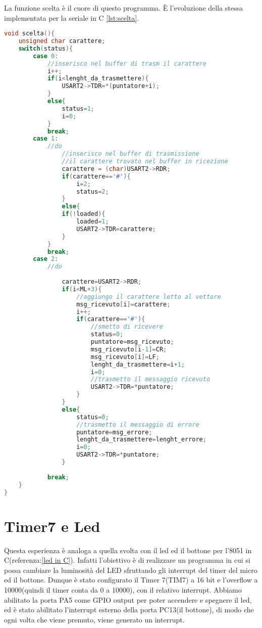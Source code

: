 \documentclass[main.tex]{subfiles}
\begin{document}
La funzione scelta è il cuore di questo programma. È l'evoluzione della stessa implementata per la seriale in C \ref{lst:scelta}.
\begin{lstlisting}[language=C,caption=Funzione scelta,label={lst:scelta_due}]
void scelta(){
	unsigned char carattere;
	switch(status){
		case 0:
			//inserisco nel buffer di trasm il carattere
			i++;
			if(i<lenght_da_trasmettere){
				USART2->TDR=*(puntatore+i);
			}
			else{
				status=1;
				i=0;
			}
			break;
		case 1:
			//do
				//inserisco nel buffer di trasmissione
				//il carattere trovato nel buffer in ricezione
				carattere = (char)USART2->RDR;
				if(carattere=='#'){
					i=2;
					status=2;
				}
				else{
				if(!loaded){
					loaded=1;
					USART2->TDR=carattere;
				}
			}
			break;
		case 2:
			//do
				
				carattere=USART2->RDR;
				if(i<ML+3){
					//aggiungo il carattere letto al vettore
					msg_ricevuto[i]=carattere;
					i++;
					if(carattere=='#'){
						//smetto di ricevere
						status=0;
						puntatore=msg_ricevuto;
						msg_ricevuto[i-1]=CR;
						msg_ricevuto[i]=LF;
						lenght_da_trasmettere=i+1;
						i=0;
						//trasmetto il messaggio ricevuto
						USART2->TDR=*puntatore;
					}
				}
				else{
					status=0;
					//trasmetto il messaggio di errore
					puntatore=msg_errore;
					lenght_da_trasmettere=lenght_errore;
					i=0;
					USART2->TDR=*puntatore;
				}
			
			break;
	}
}
\end{lstlisting}
\section{Timer7 e Led}
Questa esperienza è analoga a quella svolta con il led ed il bottone per l'8051 in C(referenza:\ref{led in C}). Infatti l'obiettivo è di realizzare un programma in cui si possa cambiare la luminosità del LED sfruttando gli interrupt del timer del micro ed il bottone. Dunque è stato configurato il Timer 7(TIM7) a 16 bit e l'overflow a 10000(quindi il timer conta da 0 a 10000), con il relativo interrupt. Abbiamo abilitato la porta PA5 come GPIO output per poter accendere e spegnere il led, ed è stato abilitato l'interrupt esterno della porta PC13(il bottone), di modo che ogni volta che viene premuto, viene generato un interrupt.
\end{document}
